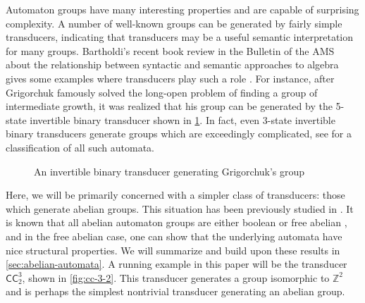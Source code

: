 \documentclass[12pt, letterpaper]{article}
\newcommand{\Z}{\mathbb Z}
\newcommand{\CC}{\mathsf{CC}}
\begin{document}
Automaton groups have many interesting properties and are capable of surprising
complexity. A number of well-known groups can be generated by fairly simple
transducers, indicating that transducers may be a useful semantic
interpretation for many groups. Bartholdi's recent book review in the Bulletin
of the AMS about the relationship between syntactic and semantic approaches to
algebra gives some examples where transducers play such a role
\cite{Bartholdi17:syntax_semantic_review}.  For instance, after Grigorchuk
famously solved the long-open problem of finding a group of intermediate
growth, it was realized that his group can be generated by the 5-state
invertible binary transducer shown in \cref{fig:grigorchuk}.  In fact, even
3-state invertible binary transducers generate groups which are exceedingly
complicated, see \cite{2008arXiv0803.3555B} for a classification of all such
automata.
\begin{figure}[ht]
    \centering
    \caption{An invertible binary transducer generating Grigorchuk's group}
    \label{fig:grigorchuk}
\end{figure}

Here, we will be primarily concerned with a simpler class of transducers: those
which generate abelian groups. This situation has been previously studied in
\cite{Okano-Thesis, Sutner18:abelian_automata}. It is known that all abelian
automaton groups are either boolean or free abelian \cite{Okano-Thesis}, and in
the free abelian case, one can show that the underlying automata have nice
structural properties. We will summarize and build upon these results in
\cref{sec:abelian-automata}.  A running example in this paper will be the
transducer $\CC^3_2$, shown in \cref{fig:cc-3-2}. This transducer generates a
group isomorphic to $\Z^2$ and is perhaps the simplest nontrivial transducer
generating an abelian group.
\end{document}
